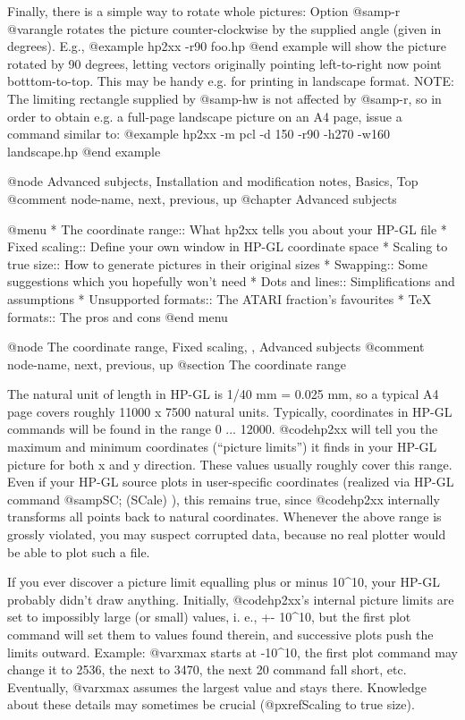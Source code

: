 Finally, there is a simple way to rotate whole pictures:
Option @samp{-r @var{angle}} rotates the picture counter-clockwise by
the supplied angle (given in degrees). E.g.,
@example
hp2xx -r90 foo.hp
@end example
will show the picture rotated by 90 degrees, letting vectors originally
pointing left-to-right now point botttom-to-top. This may be handy e.g. for
printing in landscape format.
NOTE: The limiting rectangle supplied by @samp{-hw} is not affected by
@samp{-r}, so in order to obtain e.g. a full-page landscape picture on an
A4 page, issue a command similar to:
@example
hp2xx -m pcl -d 150 -r90 -h270 -w160 landscape.hp
@end example




@node Advanced subjects, Installation and modification notes, Basics, Top
@comment  node-name,  next,  previous,  up
@chapter Advanced subjects

@menu
* The coordinate range:: What hp2xx tells you about your HP-GL file
* Fixed scaling::        Define your own window in HP-GL coordinate space
* Scaling to true size:: How to generate pictures in their original sizes
* Swapping::             Some suggestions which you hopefully won't need
* Dots and lines::       Simplifications and assumptions
* Unsupported formats::  The ATARI fraction's favourites
* TeX formats::          The pros and cons
@end menu

@node The coordinate range, Fixed scaling, , Advanced subjects
@comment  node-name,  next,  previous,  up
@section The coordinate range

The natural unit of length in HP-GL is 1/40 mm = 0.025 mm, so a typical
A4 page covers roughly 11000 x 7500 natural units. Typically, coordinates in
HP-GL commands will be found in the range 0 ... 12000. @code{hp2xx} will tell
you the maximum and minimum coordinates (``picture limits'')
it finds in your HP-GL picture for both x and y direction.
These values usually roughly cover this range.
Even if your HP-GL source plots in user-specific coordinates (realized
via HP-GL command @samp{SC;} (SCale) ), this remains true, since
@code{hp2xx} internally transforms all points back to natural coordinates.
Whenever the above range is grossly violated, you may suspect corrupted
data, because no real plotter would be able to plot such a file.

If you ever discover a picture limit equalling plus or minus 10^10,
your HP-GL probably didn't draw anything. Initially, @code{hp2xx}'s internal
picture limits are set to impossibly large (or small) values, i. e., +- 10^10,
but the first plot command will set them to values found therein, and successive
plots push the limits outward. Example: @var{xmax} starts at -10^10,
the first plot command may change it to 2536, the next to 3470, the next
20 command fall short, etc. Eventually, @var{xmax} assumes the largest
value and stays there. Knowledge about these details may sometimes
be crucial (@pxref{Scaling to true size}).

